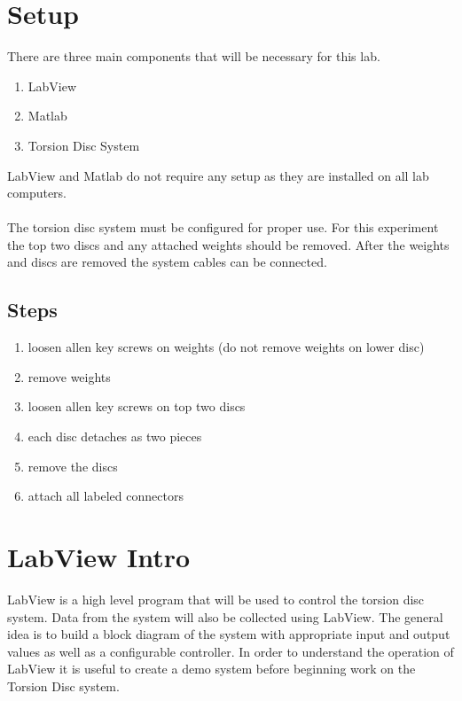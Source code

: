 \documentclass[11pt,titlepage]{article}
\begin{document}
\section{Setup}
	There are three main components that will be necessary for this lab.
	\begin{enumerate}
		\item LabView
		\item Matlab
		\item Torsion Disc System
	\end{enumerate}
	LabView and Matlab do not require any setup as they are installed on all lab computers. \\\\
	The torsion disc system must be configured for proper use. For this experiment the top two discs and any attached weights should be removed. After the weights and discs are removed the system cables can be connected.
	\subsection*{Steps}
	\begin{enumerate}
		\item loosen allen key screws on weights (do not remove weights on lower disc)
		\item remove weights
		\item loosen allen key screws on top two discs
		\item each disc detaches as two pieces
		\item remove the discs
		\item attach all labeled connectors
	\end{enumerate}

\section{LabView Intro}
	LabView is a high level program that will be used to control the torsion disc system. Data from the system will also be collected using LabView. The general idea is to build a block diagram of the system with appropriate input and output values as well as a configurable controller. In order to understand the operation of LabView it is useful to create a demo system before beginning work on the Torsion Disc system.
\end{document}
